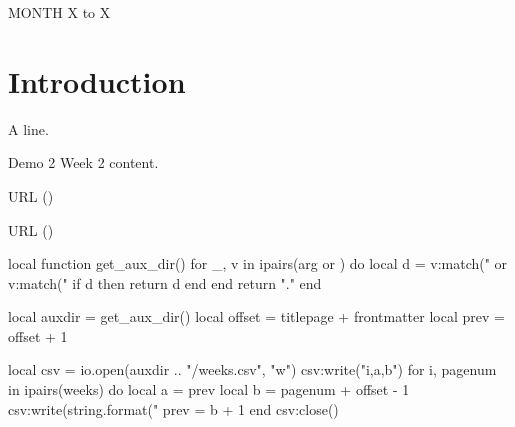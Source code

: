 \documentclass{./guidednotes}
\begin{document}
\begin{week}{MONTH X to X}
  \section{Introduction}

  A line.
\end{week} 

\begin{week}{Demo 2}
  Week 2 content.







  URL ()

  URL ()
\end{week}


\backmatter{}
\begin{luacode*}
local function get_aux_dir()
  for _, v in ipairs(arg or {}) do
    local d = v:match("%
               or v:match("%
    if d then return d end
  end
  return "."
end

local auxdir = get_aux_dir()
local offset = titlepage + frontmatter
local prev   = offset + 1

local csv = io.open(auxdir .. "/weeks.csv", "w")
csv:write("i,a,b\n")
for i, pagenum in ipairs(weeks) do
  local a = prev
  local b = pagenum + offset - 1
  csv:write(string.format("%
  prev = b + 1
end
csv:close()
\end{luacode*}
\end{document}
